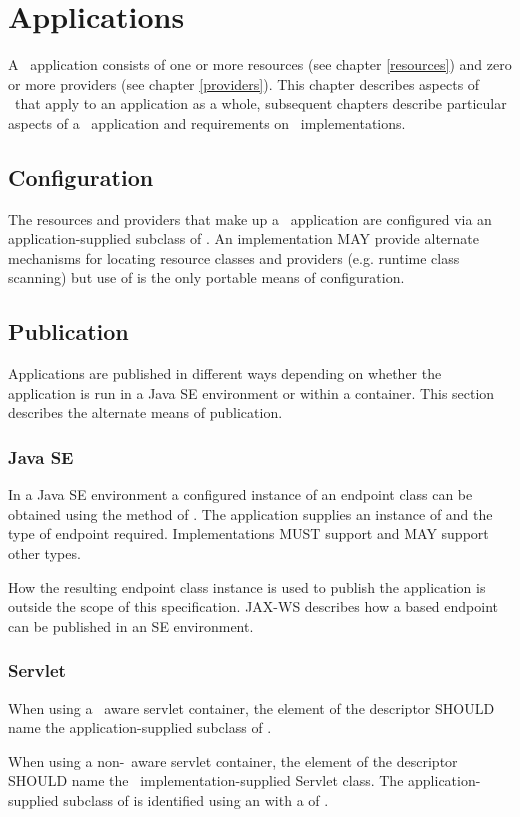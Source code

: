 \chapter{Applications}

A \jaxrs\ application consists of one or more resources (see chapter \ref{resources}) and zero or more providers (see chapter \ref{providers}). This chapter describes aspects of \jaxrs\ that apply to an application as a whole, subsequent chapters describe particular aspects of a \jaxrs\ application and requirements on \jaxrs\ implementations.

\section{Configuration}

The resources and providers that make up a \jaxrs\ application are configured via an application-supplied subclass of . An implementation MAY provide alternate mechanisms for locating resource classes and providers (e.g. runtime class scanning) but use of  is the only portable means of configuration.

\section{Publication}

Applications are published in different ways depending on whether the application is run in a Java SE environment or within a container. This section describes the alternate means of publication.

\subsection{Java SE}

In a Java SE environment a configured instance of an endpoint class can be obtained using the  method of \rd. The application supplies an instance of  and the type of endpoint required. Implementations MUST support  and MAY support other types.

How the resulting endpoint class instance is used to publish the application is outside the scope of this specification. JAX-WS describes how a  based endpoint can be published in an SE environment.

\subsection{Servlet}

When using a \jaxrs\ aware servlet container, the  element of the  descriptor SHOULD name the application-supplied subclass of .

When using a non-\jaxrs\ aware servlet container, the  element of the  descriptor SHOULD name the \jaxrs\ implementation-supplied Servlet class. The application-supplied subclass of  is identified using an  with a  of .